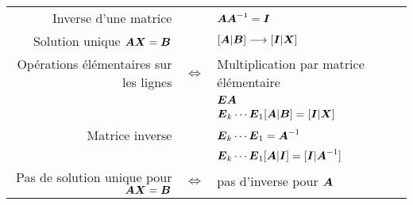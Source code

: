 \documentclass[11pt,oneside]{memoir}
\begin{document}
\thispagestyle{empty}
\begin{tabular}{rcl}
Inverse d'une matrice &  & $\boldsymbol{A} \boldsymbol{A}^{-1} = \boldsymbol{I}$\\[1cm]
Solution unique $\boldsymbol{A}\boldsymbol{X} = \boldsymbol{B}$ && $[\boldsymbol{A} | \boldsymbol{B}] \longrightarrow [\boldsymbol{I} |\boldsymbol{X}]$\\[1cm]

Opérations élémentaires sur les lignes & {\color{red}$\Leftrightarrow$} & Multiplication par matrice élémentaire \\
&& $\boldsymbol{E}\boldsymbol{A}$ \\[1cm]

&& $\boldsymbol{E}_k \cdots \boldsymbol{E}_1 [\boldsymbol{A} | \boldsymbol{B}] = [\boldsymbol{I} | \boldsymbol{X}]$
\\[1cm]
Matrice inverse && $\boldsymbol{E}_k \cdots \boldsymbol{E}_1 = \boldsymbol{A}^{-1}$ \\[1cm]
&& $\boldsymbol{E}_k \cdots \boldsymbol{E}_1 [\boldsymbol{A} | \boldsymbol{I}] = [\boldsymbol{I} | \boldsymbol{A}^{-1}]$
\\[1cm]


Pas de solution unique pour $\boldsymbol{A}\boldsymbol{X} = \boldsymbol{B}$ & {\color{red}$\Leftrightarrow$} & pas d'inverse pour $\boldsymbol{A}$
\end{tabular}
\end{document}
